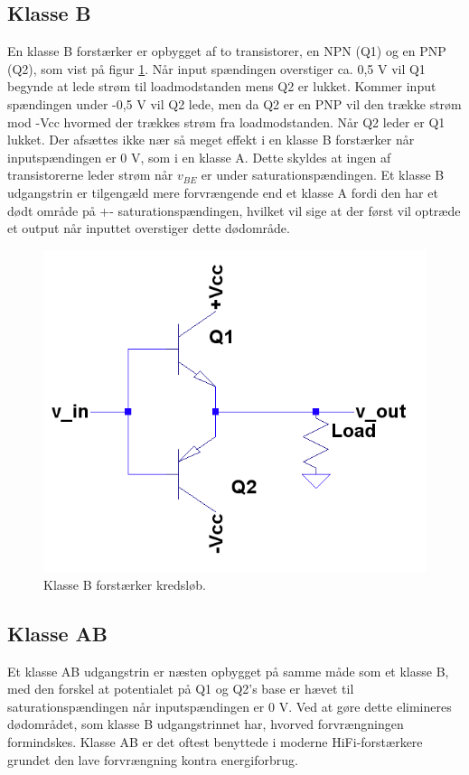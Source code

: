 \subsection{Klasse B}
En klasse B forstærker er opbygget af to transistorer, en NPN (Q1) og en PNP (Q2), som vist på figur \ref{fig:classb}. Når input spændingen overstiger ca. 0,5 V vil Q1 begynde at lede strøm til loadmodstanden mens Q2 er lukket. Kommer input spændingen under -0,5 V vil Q2 lede, men da Q2 er en PNP vil den trække strøm mod -Vcc hvormed der trækkes strøm fra loadmodstanden. Når Q2 leder er Q1 lukket. 
Der afsættes ikke nær så meget effekt i en klasse B forstærker når inputspændingen er 0 V, som i en klasse A. Dette skyldes at ingen af transistorerne leder strøm når $v_{BE} $ er under saturationspændingen. Et klasse B udgangstrin er tilgengæld mere forvrængende end et klasse A fordi den har et dødt område på  +- saturationspændingen, hvilket vil sige at der først vil optræde et output når inputtet overstiger dette dødområde.  

\begin{figure}[h]
\centering
\includegraphics[scale=.35]{klasser/classb.png}
\caption{Klasse B forstærker kredsløb.}
\label{fig:classb}
\end{figure}

\subsection{Klasse AB}

Et klasse AB udgangstrin er næsten opbygget på samme måde som et klasse B, med den forskel at potentialet på Q1 og Q2's base er hævet til saturationspændingen når inputspændingen er 0 V. Ved at gøre dette elimineres dødområdet, som klasse B udgangstrinnet har, hvorved forvrængningen formindskes. 
Klasse AB er det oftest benyttede i moderne HiFi-forstærkere grundet den lave forvrængning kontra energiforbrug. 

